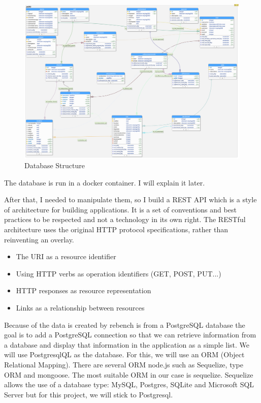 \documentclass{article}
\begin{document}
\begin{figure}[h!]
    \centering
    \includegraphics[width=1\textwidth]{images/database.png}
    \caption{Database Structure}
    \label{fig:database}
\end{figure}

The database is run in a docker container. I will explain it later.

After that, I needed to manipulate them, so I build a REST API which is a style of architecture for building applications. It is a set of conventions and best practices to be respected and not a technology in its own right. The RESTful architecture uses the original HTTP protocol specifications, rather than reinventing an overlay.

\begin{itemize}
    \item The URI as a resource identifier
    \item Using HTTP verbs as operation identifiers (GET, POST, PUT...)
    \item HTTP responses as resource representation
    \item Links as a relationship between resources
\end{itemize}

Because of the data is created by rebench is from a PostgreSQL database the goal is to add a PostgreSQL connection so that we can retrieve information from a database and display that information in the application as a simple list.
We will use PostgresqlQL as the database. For this, we will use an ORM (Object Relational Mapping). There are several ORM node.js such as Sequelize, type ORM and mongoose. The most suitable ORM in our case is sequelize. Sequelize allows the use of a database type: MySQL, Postgres, SQLite and Microsoft SQL Server but for this project, we will stick to Postgresql.
\end{document}
